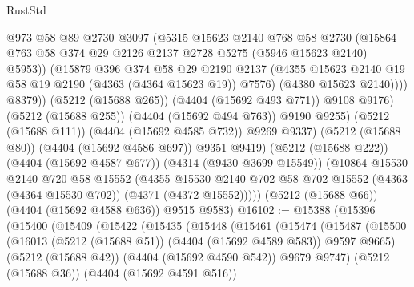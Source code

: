 \begin{lexlean}{RustStd}
\begin{coremodule}
                        @973
                        @58
                        @89
                        @2730
                        @3097
                        (@5315
                          @15623
                          @2140
                          @768
                          @58
                          @2730
                          (@15864
                            @763
                            @58
                            @374
                            @29
                            @2126
                            @2137
                            @2728
                            @5275
                            (@5946 @15623 @2140)
                            @5953))
                        (@15879
                          @396
                          @374
                          @58
                          @29
                          @2190
                          @2137
                          (@4355 @15623 @2140 @19 @58 @19 @2190 (@4363 (@4364 @15623 @19)) @7576)
                          (@4380 @15623 @2140))))
                    @8379))
                (@5212 (@15688 @265))
                (@4404 (@15692 @493 @771))
                @9108
                @9176)
              (@5212 (@15688 @255))
              (@4404 (@15692 @494 @763))
              @9190
              @9255)
            (@5212 (@15688 @111))
            (@4404 (@15692 @4585 @732))
            @9269
            @9337)
          (@5212 (@15688 @80))
          (@4404 (@15692 @4586 @697))
          @9351
          @9419)
        (@5212 (@15688 @222))
        (@4404 (@15692 @4587 @677))
        (@4314 (@9430 @3699 @15549))
        (@10864
          @15530
          @2140
          @720
          @58
          @15552
          (@4355
            @15530
            @2140
            @702
            @58
            @702
            @15552
            (@4363 (@4364 @15530 @702))
            (@4371 (@4372 @15552)))))
      (@5212 (@15688 @66))
      (@4404 (@15692 @4588 @636))
      @9515
      @9583)
@16102 := @15388
    (@15396
      (@15400
        (@15409
          (@15422
            (@15435
              (@15448
                (@15461
                  (@15474
                    (@15487
                      (@15500
                        (@16013 (@5212 (@15688 @51)) (@4404 (@15692 @4589 @583)) @9597 @9665)
                        (@5212 (@15688 @42))
                        (@4404 (@15692 @4590 @542))
                        @9679
                        @9747)
                      (@5212 (@15688 @36))
                      (@4404 (@15692 @4591 @516))

\end{coremodule}
\end{lexlean}
